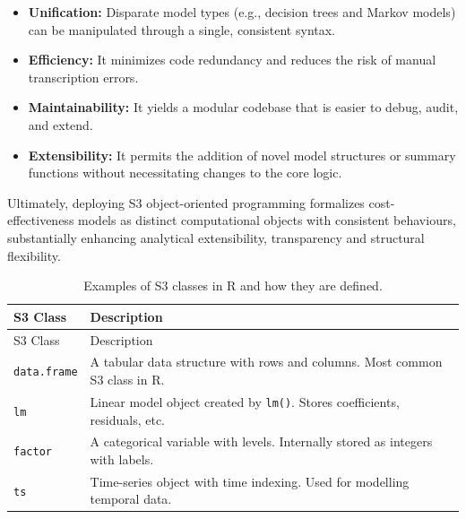 \documentclass[
]{article}
\providecommand{\tightlist}{%
  \setlength{\itemsep}{0pt}\setlength{\parskip}{0pt}}
\begin{document}
\begin{itemize}
\tightlist
\item
  \textbf{Unification:} Disparate model types (e.g., decision trees and
  Markov models) can be manipulated through a single, consistent syntax.
\item
  \textbf{Efficiency:} It minimizes code redundancy and reduces the risk
  of manual transcription errors.
\item
  \textbf{Maintainability:} It yields a modular codebase that is easier
  to debug, audit, and extend.
\item
  \textbf{Extensibility:} It permits the addition of novel model
  structures or summary functions without necessitating changes to the
  core logic.
\end{itemize}

Ultimately, deploying S3 object-oriented programming formalizes
cost-effectiveness models as distinct computational objects with
consistent behaviours, substantially enhancing analytical extensibility,
transparency and structural flexibility.

\begin{longtable}[]{@{}
  >{\raggedright\arraybackslash}p{}
  >{\raggedright\arraybackslash}p{}@{}}
\caption{Examples of S3 classes in R and how they are
defined.}\label{tbl-s3classes}\tabularnewline
\toprule\noalign{}
\begin{minipage}[b]{\linewidth}\raggedright
S3 Class
\end{minipage} & \begin{minipage}[b]{\linewidth}\raggedright
Description
\end{minipage} \\
\midrule\noalign{}
\endfirsthead
\toprule\noalign{}
\begin{minipage}[b]{\linewidth}\raggedright
S3 Class
\end{minipage} & \begin{minipage}[b]{\linewidth}\raggedright
Description
\end{minipage} \\
\midrule\noalign{}
\endhead
\bottomrule\noalign{}
\endlastfoot
\texttt{data.frame} & A tabular data structure with rows and columns.
Most common S3 class in R. \\
\texttt{lm} & Linear model object created by \texttt{lm()}. Stores
coefficients, residuals, etc. \\
\texttt{factor} & A categorical variable with levels. Internally stored
as integers with labels. \\
\texttt{ts} & Time-series object with time indexing. Used for modelling
temporal data. \\
\end{longtable}
\end{document}
